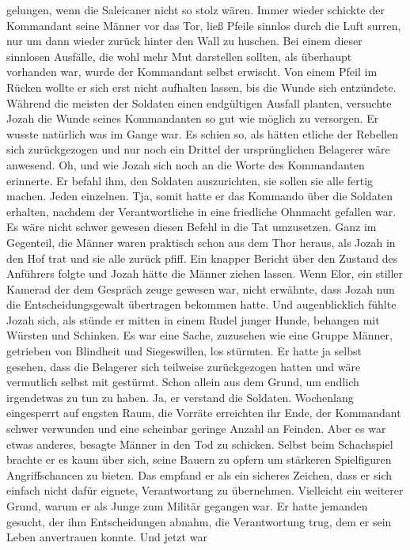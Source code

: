gelungen, wenn die Saleicaner nicht so stolz wären. Immer wieder schickte der Kommandant seine 
Männer vor das Tor, ließ Pfeile sinnlos durch die Luft surren, nur um dann wieder zurück hinter den 
Wall zu huschen. Bei einem dieser sinnlosen Ausfälle, die wohl mehr Mut darstellen sollten, als 
überhaupt vorhanden war, wurde der Kommandant selbst erwischt. Von einem Pfeil im Rücken wollte er 
sich erst nicht aufhalten lassen, bis die Wunde sich entzündete. Während die meisten der Soldaten 
einen endgültigen Ausfall planten, versuchte Jozah die Wunde seines Kommandanten so gut wie möglich 
zu versorgen. Er wusste natürlich was im Gange war. Es schien so, als hätten etliche der Rebellen 
sich zurückgezogen und nur noch ein Drittel der ursprünglichen Belagerer wäre anwesend. Oh, und wie 
Jozah sich noch an die Worte des Kommandanten erinnerte. Er befahl ihm, den Soldaten auszurichten, 
sie sollen sie alle fertig machen. Jeden einzelnen. Tja, somit hatte er das Kommando über die 
Soldaten erhalten, nachdem der Verantwortliche in eine friedliche Ohnmacht gefallen war. Es wäre 
nicht schwer gewesen diesen Befehl in die Tat umzusetzen. Ganz im Gegenteil, die Männer waren 
praktisch schon aus dem Thor heraus, als Jozah in den Hof trat und sie alle zurück pfiff. Ein 
knapper Bericht über den Zustand des Anführers folgte und Jozah hätte die Männer ziehen lassen. Wenn 
Elor, ein stiller Kamerad der dem Gespräch zeuge gewesen war, nicht erwähnte, dass Jozah nun die 
Entscheidungsgewalt übertragen bekommen hatte. Und augenblicklich fühlte Jozah sich, als stünde er 
mitten in einem Rudel junger Hunde, behangen mit Würsten und Schinken. Es war eine Sache, zuzusehen 
wie eine Gruppe Männer, getrieben von Blindheit und Siegeswillen, los stürmten. Er hatte ja selbst 
gesehen, dass die Belagerer sich teilweise zurückgezogen hatten und wäre vermutlich selbst mit 
gestürmt. Schon allein aus dem Grund, um endlich irgendetwas zu tun zu haben. Ja, er verstand die 
Soldaten. Wochenlang eingesperrt auf engsten Raum, die Vorräte erreichten ihr Ende, der Kommandant 
schwer verwunden und eine scheinbar geringe Anzahl an Feinden. Aber es war etwas anderes, besagte 
Männer in den Tod zu schicken. Selbst beim Schachspiel brachte er es kaum über sich, seine Bauern zu 
opfern um stärkeren Spielfiguren Angriffschancen zu bieten. Das empfand er als ein sicheres Zeichen, 
dass er sich einfach nicht dafür eignete, Verantwortung zu übernehmen. Vielleicht ein weiterer 
Grund, warum er als Junge zum Militär gegangen war. Er hatte jemanden gesucht, der ihm 
Entscheidungen abnahm, die Verantwortung trug, dem er sein Leben anvertrauen konnte. Und jetzt war 
